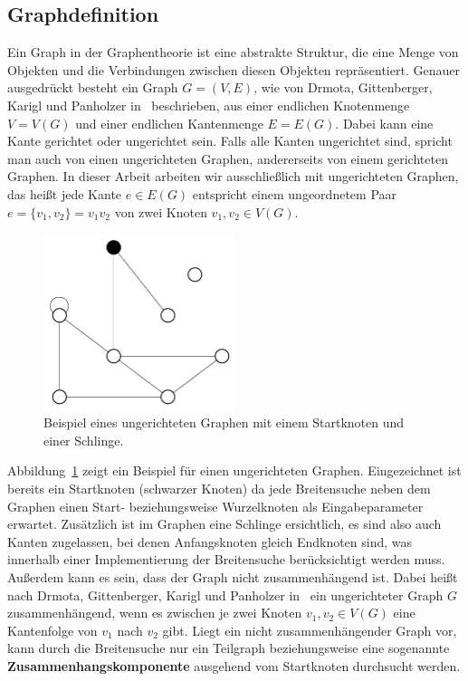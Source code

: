 \documentclass[11pt,a4paper]{article}
\begin{document}
\subsection{Graphdefinition}
Ein Graph in der Graphentheorie ist eine abstrakte Struktur, die eine Menge von Objekten und die Verbindungen zwischen diesen Objekten repräsentiert. Genauer ausgedrückt besteht ein Graph \(G = (V, E)\), wie von Drmota, Gittenberger, Karigl und Panholzer in~\cite{mathematik} beschrieben,  aus einer endlichen Knotenmenge \(V = V(G)\) und einer endlichen Kantenmenge \(E = E(G)\). Dabei kann eine Kante gerichtet oder ungerichtet sein. Falls alle Kanten ungerichtet sind, spricht man auch von einen ungerichteten Graphen, andererseits von einem gerichteten Graphen. In dieser Arbeit arbeiten wir ausschließlich mit ungerichteten Graphen, das heißt jede Kante \(e \in E(G)\) entspricht einem ungeordnetem Paar \(e = \{ v_{1},v_{2} \} = v_{1}v_{2}\) von zwei Knoten \(v_{1}, v_{2} \in V(G)\).
\begin{figure}[h]
 	\centering
	\includegraphics[width=0.5\textwidth]{graph}
 	\caption{Beispiel eines ungerichteten Graphen mit einem Startknoten und einer Schlinge.}
	\label{fig:graph}
\end{figure}
Abbildung~\ref{fig:graph} zeigt ein Beispiel für einen ungerichteten Graphen. Eingezeichnet ist bereits ein Startknoten (schwarzer Knoten) da jede Breitensuche neben dem Graphen einen Start- beziehungsweise Wurzelknoten als Eingabeparameter erwartet. Zusätzlich ist im Graphen eine Schlinge ersichtlich, es sind also auch Kanten zugelassen, bei denen Anfangsknoten gleich Endknoten sind, was innerhalb einer Implementierung der Breitensuche berücksichtigt werden muss. Außerdem kann es sein, dass der Graph nicht zusammenhängend ist. Dabei heißt nach Drmota, Gittenberger, Karigl und Panholzer in~\cite{mathematik} ein ungerichteter Graph \(G\) zusammenhängend, wenn es zwischen je zwei Knoten \(v_{1},v_{2} \in V(G)\) eine Kantenfolge von \(v_{1}\) nach \(v_{2}\) gibt. Liegt ein nicht zusammenhängender Graph vor, kann durch die Breitensuche nur ein Teilgraph beziehungsweise eine sogenannte \textbf{Zusammenhangskomponente} ausgehend vom Startknoten durchsucht werden.\\
\end{document}
